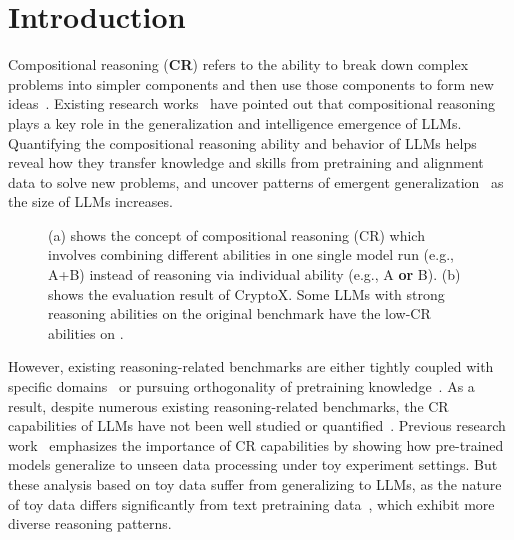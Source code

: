 \section{Introduction}
Compositional reasoning (\textbf{CR}) refers to the ability to break down complex problems into simpler components and then use those components to form new ideas~\citep{hou-etal-2023-towards}.
Existing research works~\citep{wang2024grokked, hou-etal-2023-towards, cheng2024understanding} have pointed out that compositional reasoning plays a key role in the generalization and intelligence emergence of LLMs.
Quantifying the compositional reasoning ability and behavior of LLMs helps reveal how they transfer knowledge and skills from pretraining and alignment data to solve new problems, and uncover patterns of emergent generalization~\citep{Measuring_Massive_Multitask} as the size of LLMs increases.


\begin{figure}[t]
    \centering
    \vskip 0.2in
    \caption{(a) shows the concept of compositional reasoning (CR) which involves combining different abilities in one single model run (e.g., A+B) instead of reasoning via individual ability (e.g., A \textbf{or} B). (b) shows the evaluation result of CryptoX. Some LLMs with strong reasoning abilities on the original benchmark have the low-CR abilities on \benchmark{}.}
    \label{fig:concept}
    \vskip -0.2in
\end{figure}

However, existing reasoning-related benchmarks are either tightly coupled with specific domains~\citep{cobbe2021training,hendrycks2021measuring,han2022folio} or pursuing orthogonality of pretraining knowledge~\citep{gui2024logicgame,ma2024kor}.
As a result, despite numerous existing reasoning-related benchmarks, the CR capabilities of LLMs have not been well studied or quantified~\citep{hou-etal-2023-towards}.
Previous research work~\citep{wang2024grokked} emphasizes the importance of CR capabilities by showing how pre-trained models generalize to unseen data processing under toy experiment settings. But these analysis based on toy data suffer from generalizing to LLMs, as the nature of toy data differs significantly from text pretraining data~\citep{ma2024kor}, which exhibit more diverse reasoning patterns.

